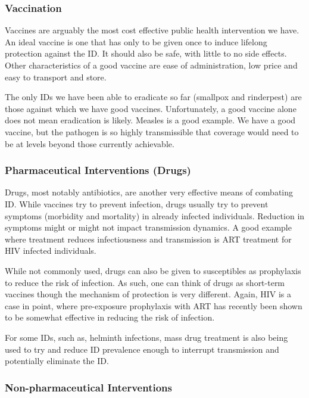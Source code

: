 \documentclass[]{article}
\theoremstyle{definition}
\theoremstyle{definition}
\theoremstyle{definition}
\theoremstyle{remark}
\begin{document}
\subsubsection{Vaccination}\label{vaccination}

Vaccines are arguably the most cost effective public health intervention
we have. An ideal vaccine is one that has only to be given once to
induce lifelong protection against the ID. It should also be safe, with
little to no side effects. Other characteristics of a good vaccine are
ease of administration, low price and easy to transport and store.

The only IDs we have been able to eradicate so far (smallpox and
rinderpest) are those against which we have good vaccines.
Unfortunately, a good vaccine alone does not mean eradication is likely.
Measles is a good example. We have a good vaccine, but the pathogen is
so highly transmissible that coverage would need to be at levels beyond
those currently achievable.

\subsubsection{Pharmaceutical Interventions
(Drugs)}\label{pharmaceutical-interventions-drugs}

Drugs, most notably antibiotics, are another very effective means of
combating ID. While vaccines try to prevent infection, drugs usually try
to prevent symptoms (morbidity and mortality) in already infected
individuals. Reduction in symptoms might or might not impact
transmission dynamics. A good example where treatment reduces
infectiousness and transmission is ART treatment for HIV infected
individuals.

While not commonly used, drugs can also be given to susceptibles as
prophylaxis to reduce the risk of infection. As such, one can think of
drugs as short-term vaccines though the mechanism of protection is very
different. Again, HIV is a case in point, where pre-exposure prophylaxis
with ART has recently been shown to be somewhat effective in reducing
the risk of infection.

For some IDs, such as, helminth infections, mass drug treatment is also
being used to try and reduce ID prevalence enough to interrupt
transmission and potentially eliminate the ID.

\subsubsection{Non-pharmaceutical
Interventions}\label{non-pharmaceutical-interventions}
\end{document}
